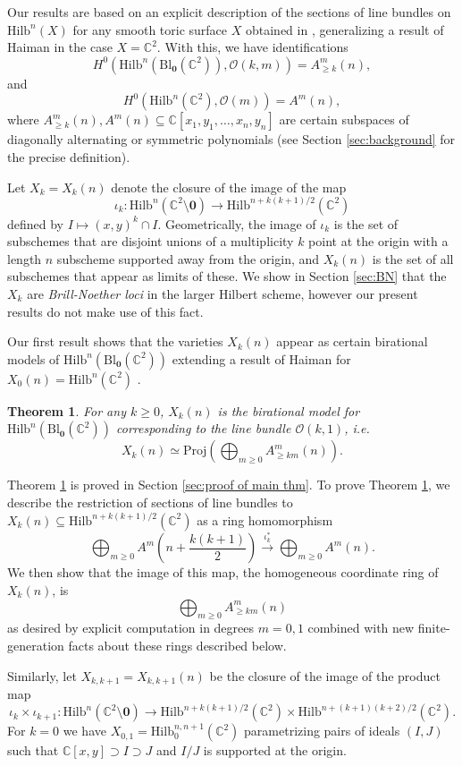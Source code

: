 \documentclass[12pt]{amsart}
\newcommand{\Hilb}{\mathrm{Hilb}}
\newcommand{\C}{\mathbb{C}}
\newcommand{\CO}{\mathcal{O}}
\newcommand{\Proj}{\mathrm{Proj}}
\newcommand{\Bl}{\mathrm{Bl}}
\numberwithin{equation}{section}
\newtheorem{theorem}{Theorem}[section]
\theoremstyle{definition}
\begin{document}
Our results are based on an explicit description of the sections of line bundles on $\Hilb^n(X)$ for any smooth toric surface $X$ obtained in \cite{CGOT}, generalizing a result of Haiman \cite{Haimanqt} in the case $X= \C^2$. With this, we have identifications
\[ H^0(\Hilb^n(\Bl_{\mathbf{0}}(\C^2)),\CO(k,m)) = A^m_{\geq k}(n), \]
and 
\[ H^0(\Hilb^n(\C^2),\CO(m))= A^m(n), \]
where $A^m_{\geq k}(n),A^m(n)\subseteq \C[x_1,y_1,\dots,x_n,y_n]$ are certain subspaces of diagonally alternating or symmetric polynomials (see Section \ref{sec:background} for the precise definition).

Let $X_k = X_k(n)$ denote the closure of the image of the map \[ \iota_k: \Hilb^n(\C^2\setminus\mathbf{0})\to \Hilb^{n+k(k+1)/2}(\C^2) \]
defined by $I\mapsto (x,y)^k \cap I$. Geometrically, the image of $\iota_k$ is the set of subschemes that are disjoint unions of a multiplicity $k$ point at the origin with a length $n$ subscheme supported away from the origin, and $X_k(n)$ is the set of all subschemes that appear as limits of these. We show in Section \ref{sec:BN} that the $X_k$ are \emph{Brill-Noether loci} in the larger Hilbert scheme, however our present results do not make use of this fact.

Our first result shows that the varieties $X_k(n)$ appear as certain birational models of $\Hilb^n(\Bl_{\mathbf{0}}(\C^2))$ extending a result of Haiman for $X_0(n) = \Hilb^n(\C^2)$ \cite{Haimanqt}.

\begin{theorem}\label{thm:main1}
    For any $k\geq 0$, $X_k(n)$ is the birational model for $\Hilb^n(\Bl_{\mathbf{0}}(\C^2))$ corresponding to the line bundle $\CO(k,1)$, i.e.
    \[ X_k(n) \simeq \Proj\left( \bigoplus_{m\geq 0}A^m_{\geq km}(n)\right). \]
\end{theorem}

Theorem \ref{thm:main1} is proved in Section \ref{sec:proof of main thm}. To prove Theorem \ref{thm:main1}, we describe the restriction of sections of line bundles to $X_k(n)\subseteq \Hilb^{n+k(k+1)/2}(\C^2)$ as a ring homomorphism
\[ \bigoplus_{m\geq 0} A^m\left( n+\frac{k(k+1)}{2} \right) \xrightarrow{\iota_k^*} \bigoplus_{m\geq 0} A^m\left( n \right). \] 
We then show that the image of this map, the homogeneous coordinate ring of $X_k(n)$, is
\[ \bigoplus_{m\geq 0}A^m_{\geq km}(n) \]
as desired by explicit computation in degrees $m=0,1$ combined with new finite-generation facts about these rings described below.

Similarly, let $X_{k,k+1} = X_{k,k+1}(n)$ be the closure of the image of the product map 
\[ \iota_k\times\iota_{k+1}:\Hilb^n(\C^2\setminus\mathbf{0})\to \Hilb^{n+k(k+1)/2}(\C^2)\times \Hilb^{n+(k+1)(k+2)/2}(\C^2). \]
For $k=0$ we have $X_{0,1}=\Hilb^{n,n+1}_0(\C^2)$
parametrizing pairs of ideals $(I,J)$ such that $\C[x,y]\supset I\supset J$ and $I/J$ is supported at the origin. 
\end{document}
